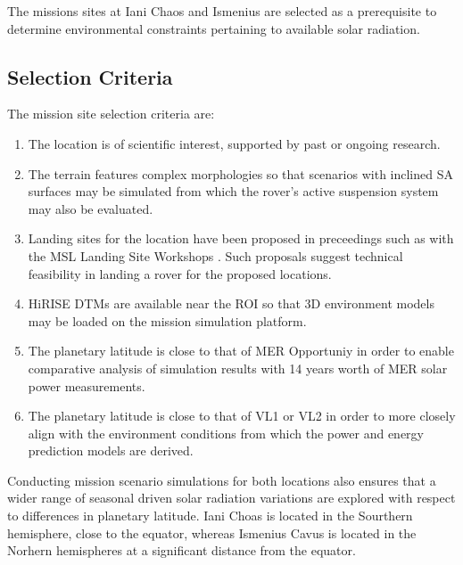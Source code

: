The missions sites at Iani Chaos and Ismenius are selected as a prerequisite to determine environmental constraints pertaining to available solar radiation.

\subsection{Selection Criteria}
\label{sec:MissionSites:SelectionCriteria}
The mission site selection criteria are:

\begin{enumerate}[label=\textcolor{BulletBlue}{(\alph*)}]
    \item The location is of scientific interest, supported by past or ongoing research.
    \item The terrain features complex morphologies so that scenarios with inclined \ac{SA} surfaces may be simulated from which the rover's active suspension system may also be evaluated.
    \item Landing sites for the location have been proposed in preceedings such as with the \ac{MSL} Landing Site Workshops . Such proposals suggest technical feasibility in landing a rover for the proposed locations.
    \item \ac{HiRISE} \acp{DTM} are available near the \ac{ROI} so that 3D environment models may be loaded on the mission simulation platform.
    \item The planetary latitude is close to that of \ac{MER} Opportuniy in order to enable comparative analysis of simulation results with 14 years worth of \ac{MER} solar power measurements.
    \item The planetary latitude is close to that of \ac{VL1} or \ac{VL2} in order to more closely align with the environment conditions from which the power and energy prediction models are derived.
\end{enumerate}

Conducting mission scenario simulations for both locations also ensures that a wider range of seasonal driven solar radiation variations are explored with respect to differences in planetary latitude. Iani Choas is located in the Sourthern hemisphere, close to the equator, whereas Ismenius Cavus is located in the Norhern hemispheres at a significant distance from the equator.

